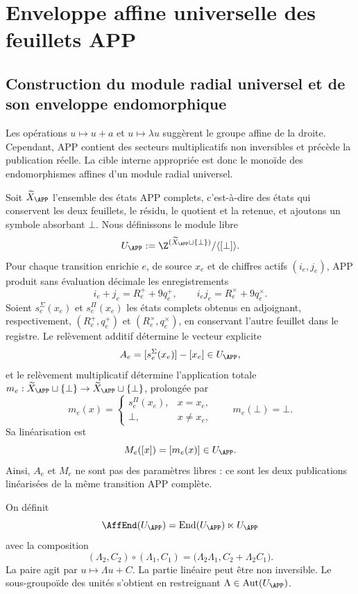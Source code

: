 \chapter{Enveloppe affine universelle des feuillets APP}

\section{Construction du module radial universel et de son enveloppe endomorphique}

Les opérations \(u\mapsto u+a\) et \(u\mapsto\lambda u\) suggèrent le groupe affine de la droite. Cependant, APP contient des secteurs multiplicatifs non inversibles et précède la publication réelle. La cible interne appropriée est donc le monoïde des endomorphismes affines d'un module radial universel.

Soit \(\widetilde X_{\APP}\) l'ensemble des états APP complets, c'est-à-dire des états qui conservent les deux feuillets, le résidu, le quotient et la retenue, et ajoutons un symbole absorbant \(\bot\). Nous définissons le module libre
\begin{equation}
 U_{\APP}:=\Z^{(\widetilde X_{\APP}\sqcup\{\bot\})}/\langle[\bot]\rangle.
 \label{espiral:eq:modulo-radial-universal}
\end{equation}
Pour chaque transition enrichie \(e\), de source \(x_e\) et de chiffres actifs \((i_e,j_e)\), APP produit sans évaluation décimale les enregistrements
\[
 i_e+j_e=R_e^++9q_e^+,
 \qquad
 i_ej_e=R_e^\times+9q_e^\times.
\]
Soient \(s_e^\Sigma(x_e)\) et \(s_e^\Pi(x_e)\) les états complets obtenus en adjoignant, respectivement, \((R_e^+,q_e^+)\) et \((R_e^\times,q_e^\times)\), en conservant l'autre feuillet dans le registre. Le relèvement additif détermine le vecteur explicite
\[
 A_e=[s_e^\Sigma(x_e)]-[x_e]\in U_{\APP},
\]
et le relèvement multiplicatif détermine l'application totale \(m_e:\widetilde X_{\APP}\sqcup\{\bot\}\to
\widetilde X_{\APP}\sqcup\{\bot\}\), prolongée par
\[
 m_e(x)=
 \begin{cases}
 s_e^\Pi(x_e),&x=x_e,\\
 \bot,&x\neq x_e,
 \end{cases}
 \qquad m_e(\bot)=\bot.
\]
Sa linéarisation est
\[
 M_e([x])=[m_e(x)]\in U_{\APP}.
\]
Ainsi, \(A_e\) et \(M_e\) ne sont pas des paramètres libres : ce sont les deux publications linéarisées de la même transition APP complète.

On définit
\[
 \AffEnd(U_{\APP})
 =\operatorname{End}(U_{\APP})\ltimes U_{\APP}
\]
avec la composition
\begin{equation}
 (\Lambda_2,C_2)\circ(\Lambda_1,C_1)
 =\bigl(\Lambda_2\Lambda_1,
 C_2+\Lambda_2C_1\bigr).
 \label{espiral:eq:producto-affend}
\end{equation}
La paire agit par \(u\mapsto\Lambda u+C\). La partie linéaire peut être non inversible. Le sous-groupoïde des unités s'obtient en restreignant \(\Lambda\in\operatorname{Aut}(U_{\APP})\).

